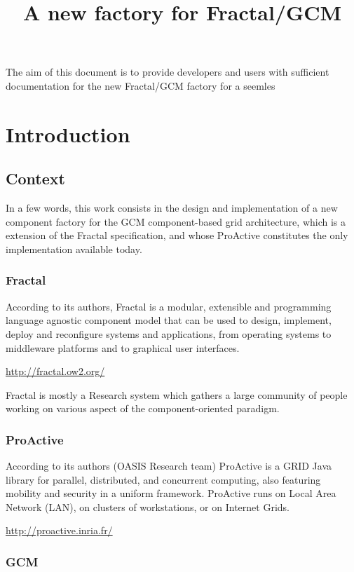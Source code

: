 \documentclass{article}
\title{A new factory for Fractal/GCM}
\author{}
\newcommand{\urll}[1]{\begin{center}\url{#1}\end{center}}
\begin{document}
\maketitle

{\footnotesize
\tableofcontents
}
\newpage


The aim of this document is to provide developers and users with sufficient documentation for the new Fractal/GCM factory
for a seemles

\section{Introduction}

\subsection{Context}

In a few words, this work consists in the design and implementation of a new component factory for
the GCM component-based grid architecture, which is a extension of the Fractal specification, and whose
ProActive constitutes the only implementation available today.


\subsubsection{Fractal}

According to its authors, Fractal is a modular, extensible and programming language agnostic component model  that can be used to design, implement, deploy and reconfigure systems and applications, from operating systems to middleware platforms and to graphical user interfaces.
\urll{http://fractal.ow2.org/}
Fractal is mostly a Research system which gathers a large community of people working on various aspect of the component-oriented
paradigm.



\subsubsection{ProActive}

According to its authors (OASIS Research team)
ProActive is a GRID Java library for parallel, distributed, and concurrent computing, also featuring mobility and security in a uniform framework.
ProActive runs on Local Area Network (LAN), on clusters of workstations, or on Internet Grids.
\urll{http://proactive.inria.fr/}

\subsubsection{GCM}
\end{document}
